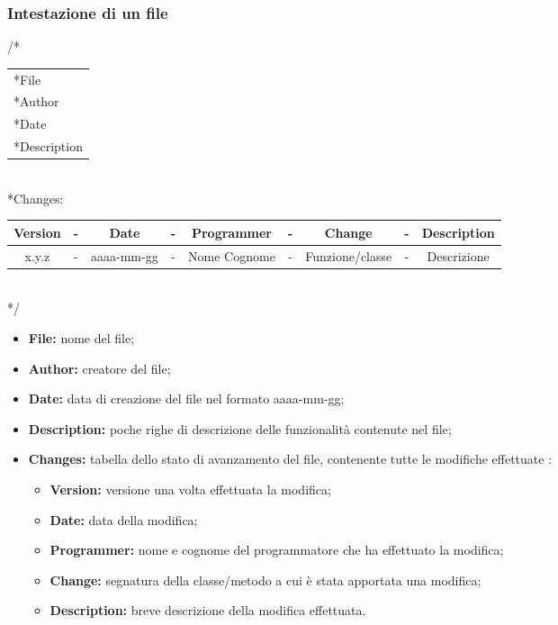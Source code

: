 \newpage
\subsubsection{Intestazione di un file}

\begin{flushleft}

/*\\
\vspace{3mm}
\begin{tabular}{l}
	*File\\
	*Author\\
	*Date\\
	*Description\\
\end{tabular}\\
\vspace{5mm}
 *Changes:\\
 \vspace{3mm}
\begin{tabular}{| c c c c c c c c c |}
	\hline
	Version & - & Date & - & Programmer & - & Change & - & Description\\
	\hline
	x.y.z & - & aaaa-mm-gg & - & Nome Cognome & - & Funzione/classe & - & Descrizione\\
	\hline
\end{tabular}\\
\vspace{3mm}
*/\\

\end{flushleft}

\begin{itemize}
	\item \textbf{File:} nome del file;
	\item \textbf{Author:} creatore del file;
	\item \textbf{Date:} data di creazione del file nel formato aaaa-mm-gg;
	\item \textbf{Description:} poche righe di descrizione delle funzionalità contenute nel file;
	\item \textbf{Changes:} tabella dello stato di avanzamento del file, contenente tutte le modifiche effettuate :
		\begin{itemize}
			\item \textbf{Version:} versione una volta effettuata la modifica;
			\item \textbf{Date:} data della modifica;
			\item \textbf{Programmer:} nome e cognome del programmatore che ha effettuato la modifica;
			\item \textbf{Change:} segnatura della classe/metodo a cui è stata apportata una modifica;
			\item \textbf{Description:} breve descrizione della modifica effettuata.
		\end{itemize}
\end{itemize}

